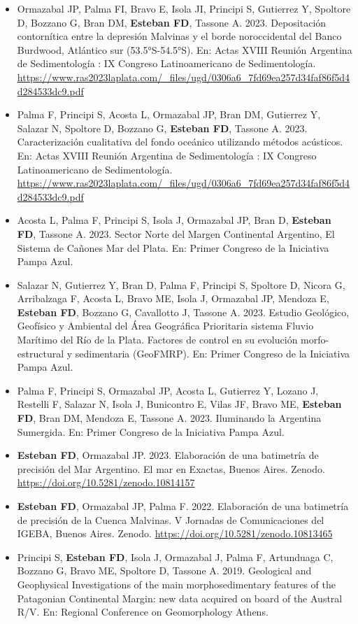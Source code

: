 \documentclass[11pt, a4paper]{article}
\begin{document}
\begin{itemize}
    \item Ormazabal JP, Palma FI, Bravo E, Isola JI, Principi S, Gutierrez Y, Spoltore D, Bozzano G, Bran DM, \textbf{Esteban FD}, Tassone A. 2023. Depositación contornítica entre la depresión Malvinas y el borde noroccidental del Banco Burdwood, Atlántico sur (53.5°S-54.5°S). En: Actas XVIII Reunión Argentina de Sedimentología : IX Congreso Latinoamericano de Sedimentología. \url{https://www.ras2023laplata.com/_files/ugd/0306a6_7fd69ea257d34faf86f5d4d284533dc9.pdf}
    \item Palma F, Principi S, Acosta L, Ormazabal JP, Bran DM, Gutierrez Y, Salazar N, Spoltore D, Bozzano G, \textbf{Esteban FD}, Tassone A. 2023. Caracterización cualitativa del fondo oceánico utilizando métodos acústicos. En: Actas XVIII Reunión Argentina de Sedimentología : IX Congreso Latinoamericano de Sedimentología. \url{https://www.ras2023laplata.com/_files/ugd/0306a6_7fd69ea257d34faf86f5d4d284533dc9.pdf}
    \item Acosta L, Palma F, Principi S, Isola J, Ormazabal JP, Bran D, \textbf{Esteban FD}, Tassone A. 2023. Sector Norte del Margen Continental Argentino, El Sistema de Cañones Mar del Plata. En: Primer Congreso de la Iniciativa Pampa Azul.
    \item Salazar N, Gutierrez Y, Bran D, Palma F, Principi S, Spoltore D, Nicora G, Arribalzaga F, Acosta L, Bravo ME, Isola J, Ormazabal JP, Mendoza E, \textbf{Esteban FD}, Bozzano G, Cavallotto J, Tassone A. 2023. Estudio Geológico, Geofísico y Ambiental del Área Geográfica Prioritaria sistema Fluvio Marítimo del Río de la Plata. Factores de control en su evolución morfo-estructural y sedimentaria (GeoFMRP). En: Primer Congreso de la Iniciativa Pampa Azul.
    \item Palma F, Principi S, Ormazabal JP, Acosta L, Gutierrez Y, Lozano J, Restelli F, Salazar N, Isola J, Bunicontro E, Vilas JF, Bravo ME, \textbf{Esteban FD}, Bran DM, Mendoza E, Tassone A. 2023. Iluminando la Argentina Sumergida. En: Primer Congreso de la Iniciativa Pampa Azul.
    \item \textbf{Esteban FD}, Ormazabal JP. 2023. Elaboración de una batimetría de precisión del Mar Argentino. El mar en Exactas, Buenos Aires. Zenodo. \url{https://doi.org/10.5281/zenodo.10814157}
    \item \textbf{Esteban FD}, Ormazabal JP, Palma F. 2022. Elaboración de una batimetría de precisión de la Cuenca Malvinas. V Jornadas de Comunicaciones del IGEBA, Buenos Aires. Zenodo. \url{https://doi.org/10.5281/zenodo.10813465}
    \item Principi S, \textbf{Esteban FD}, Isola J, Ormazabal J, Palma F, Artunduaga C, Bozzano G, Bravo ME, Spoltore D, Tassone A. 2019. Geological and Geophysical Investigations of the main morphosedimentary features of the Patagonian Continental Margin: new data acquired on board of the Austral R/V. En: Regional Conference on Geomorphology Athens.

\end{itemize}
\end{document}
